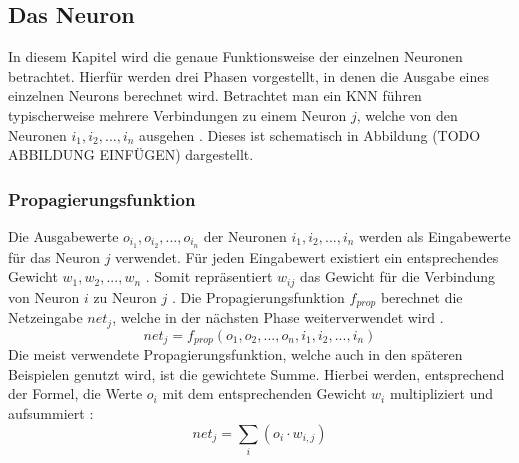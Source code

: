 \subsection{Das Neuron}
\label{subsec:neuron}
In diesem Kapitel wird die genaue Funktionsweise der einzelnen Neuronen betrachtet. Hierfür werden drei Phasen vorgestellt, in denen die Ausgabe eines einzelnen Neurons berechnet wird. Betrachtet man ein \ac{KNN} führen typischerweise mehrere Verbindungen zu einem Neuron $j$, welche von den Neuronen $i_1, i_2, ..., i_n$ ausgehen \cite{kriesel2008kleiner}. Dieses ist schematisch in Abbildung (TODO ABBILDUNG EINFÜGEN) dargestellt.

\subsubsection{Propagierungsfunktion} 
Die Ausgabewerte $o_{i_1}, o_{i_2}, ..., o_{i_n}$ der Neuronen $i_1, i_2, ..., i_n$ werden als Eingabewerte für das Neuron $j$ verwendet. Für jeden Eingabewert existiert ein entsprechendes Gewicht $w_1, w_2, ..., w_n$ \cite{kriesel2008kleiner}. Somit repräsentiert $w_{ij}$ das Gewicht für die Verbindung von Neuron $i$ zu Neuron $j$ \cite{zell2003simulation}. Die Propagierungsfunktion $f_{prop}$ berechnet die Netzeingabe $net_j$, welche in der nächsten Phase weiterverwendet wird \cite{kriesel2008kleiner}. 
$$net_j=f_{prop}(o_1, o_2, ..., o_n, i_1, i_2, ..., i_n)$$
Die meist verwendete Propagierungsfunktion, welche auch in den späteren Beispielen genutzt wird, ist die gewichtete Summe. Hierbei werden, entsprechend der Formel, die Werte $o_i$ mit dem entsprechenden Gewicht $w_i$ multipliziert und aufsummiert \cite{kriesel2008kleiner}:
$$net_j=\sum_{i}(o_{i} \cdot w_{i, j})$$

